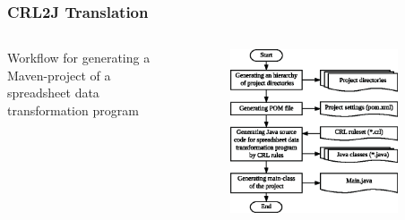 \documentclass{beamer}
\begin{document}
\begin{frame}
\frametitle{CRL2J Translation}
\begin{columns}[t]
\small Workflow for generating a Maven-project of a spreadsheet data transformation program
\begin{figure}
\includegraphics[width=0.95\linewidth]{crl2j_wf_part1}
\end{figure}

\\~\\


\end{columns}
\end{frame}
\end{document}
